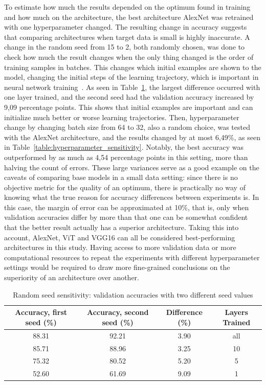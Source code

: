 \documentclass[english,twoside,openright]{UH_DS_MSc}
\begin{document}
To estimate how much the results depended on the optimum found in training and how much on the architecture, 
the best architecture AlexNet was retrained with one hyperparameter changed. The resulting 
change in accuracy suggests that comparing architectures when target data is small is highly inaccurate. 
A change in the random seed from 15 to 2, both randomly chosen, was done to check how much the result changes 
when the only thing changed is the order of training samples in batches. This changes which initial examples are shown to the model,
changing the initial steps of the learning trajectory, which is important in neural network training~\cite{transferlearning_survey}.
 As seen in Table~\ref{table:random_seed_sensitivity}, the largest difference occurred with one layer 
trained, and the second seed had the validation accuracy increased by 9,09 percentage points. This shows that initial examples 
are important and can initialize much better or worse learning trajectories. Then, hyperparameter change 
by changing batch size from 64 to 32, also a random choice, was tested with the AlexNet architecture, and the results 
changed by at most 6,49\%, as seen in Table~\ref{table:hyperparameter_sensitivity}. Notably, the best accuracy was outperformed by as much as 4,54 percentage points 
in this setting, more than halving the count of errors. These large variances serve as a good example on the caveats of comparing 
base models in a small data setting: since there is no objective metric for the quality of an optimum, there 
is practically no way of knowing what the true reason for accuracy differences between experiments is. In this case, the 
margin of error can be approximated at 10\%, that is, only when validation accuracies differ by more than that one can be 
somewhat confident that the better result actually has a superior architecture. Taking this into account, AlexNet, ViT and VGG16 
can all be considered best-performing architectures in this study. Having access to more validation data or more computational 
resources to repeat the experiments with different hyperparameter settings would be required to draw more fine-grained conclusions on the 
superiority of an architecture over another.

\begin{table}[ht]
    \centering
        \scriptsize
        \begin{tabular}{|c|c|c|c|}
            \hline
            \textbf{Accuracy, first seed (\%)} & \textbf{Accuracy, second seed (\%)} & \textbf{Difference (\%)} & \textbf{Layers Trained} \\ \hline
            88.31 & 92.21 & 3.90  & all \\\hline
            85.71 & 88.96 & 3.25 & 10  \\\hline
            75.32 & 80.52 & 5.20  & 5   \\\hline
            52.60 & 61.69 & 9.09 & 1   \\\hline
        \end{tabular}
    \caption{Random seed sensitivity: validation accuracies with two different seed values}
    \label{table:random_seed_sensitivity}
\end{table}
\end{document}
